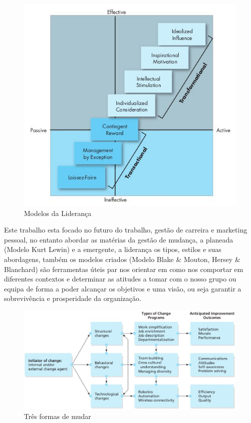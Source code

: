 \begin{figure}[H]
	\centering
	\includegraphics[scale=0.52]{./image/Leadership/Leadership Models.jpg}
	\caption{Modelos da Liderança \cite{book_2}}
\end{figure}
Este trabalho esta focado no futuro do trabalho, gestão de carreira e marketing pessoal, no entanto abordar as matérias da gestão de mudança, a planeada (Modelo Kurt Lewin) e a emergente, a liderança os tipos, estilos e suas abordagens, também os modelos criados (Modelo Blake \& Mouton, Hersey \& Blanchard) são ferramentas úteis par nos orientar em como nos comportar em diferentes contextos e determinar as atitudes a tomar com o nosso grupo ou equipa de forma a poder alcançar os objetivos e uma visão, ou seja garantir a sobrevivência e prosperidade da organização.
\begin{figure}[H]
	\centering
	\includegraphics[scale=0.52]{./image/Change/Three Change Approaches.jpg}
	\caption{Três formas de mudar \cite{book_6}}
\end{figure}
\newpage
